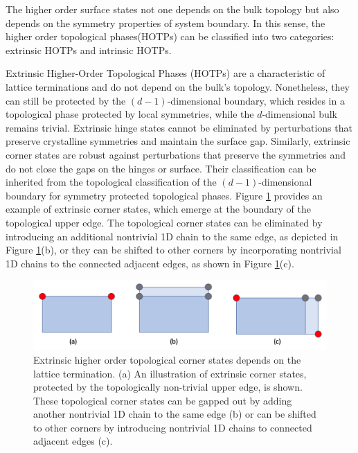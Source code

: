 The higher order surface states not one depends on the bulk topology but also depends on the symmetry properties of system boundary. In this sense, the higher order topological phases(HOTPs) can be classified into two categories: extrinsic HOTPs and intrinsic HOTPs\cite{trifunovic2019higher, trifunovic2021higher,lei2022topological}. 


Extrinsic Higher-Order Topological Phases (HOTPs) are a characteristic of lattice terminations and do not depend on the bulk's topology. Nonetheless, they can still be protected by the $(d-1)$-dimensional boundary, which resides in a topological phase protected by local symmetries, while the $d$-dimensional bulk remains trivial. Extrinsic hinge states cannot be eliminated by perturbations that preserve crystalline symmetries and maintain the surface gap. Similarly, extrinsic corner states are robust against perturbations that preserve the symmetries and do not close the gaps on the hinges or surface. Their classification can be inherited from the topological classification of the $(d-1)$-dimensional boundary for symmetry protected topological  phases. Figure \ref{fig:Extrinsic} provides an example of extrinsic corner states, which emerge at the boundary of the topological upper edge. The topological corner states can be eliminated by introducing an additional nontrivial 1D chain to the same edge, as depicted in Figure \ref{fig:Extrinsic}(b), or they can be shifted to other corners by incorporating nontrivial 1D chains to the connected adjacent edges, as shown in Figure \ref{fig:Extrinsic}(c).

 \begin{figure}[h]
    \centering
    \includegraphics[width =\textwidth]{images/HOTI.png}
    \caption{ Extrinsic higher order topological corner states depends on the lattice termination.
(a) An illustration of extrinsic corner states, protected by the topologically non-trivial upper edge, is shown. These topological corner states can be gapped out by adding another nontrivial 1D chain to the same edge (b) or can be shifted to other corners by introducing nontrivial 1D chains to connected adjacent edges (c).}
    \label{fig:Extrinsic}
\end{figure}

